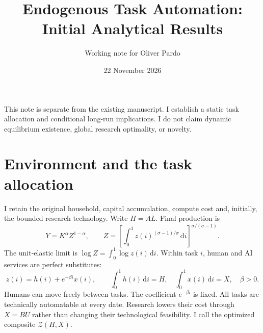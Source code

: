\documentclass[11pt]{article}
\title{Endogenous Task Automation: Initial Analytical Results}
\author{Working note for Oliver Pardo}
\date{22 November 2026}
\newcommand{\dd}{\,\mathrm d}
\begin{document}
\maketitle
\noindent This note is separate from the existing manuscript. I establish a static
task allocation and conditional long-run implications. I do not claim dynamic
equilibrium existence, global research optimality, or novelty.

\section{Environment and the task allocation}
I retain the original household, capital accumulation, compute cost and, initially,
the bounded research technology. Write $H=AL$. Final production is
\begin{equation}
 Y=K^\alpha Z^{1-\alpha},\qquad
 Z=\left[\int_0^1 z(i)^{(\sigma-1)/\sigma}\dd i\right]^{\sigma/(\sigma-1)}.
 \label{eq:tasks-aggregate}
\end{equation}
The unit-elastic limit is $\log Z=\int_0^1\log z(i)\dd i$.
Within task $i$, human and AI services are perfect substitutes:
\begin{equation}
 z(i)=h(i)+e^{-\beta i}x(i),\qquad
 \int_0^1h(i)\dd i=H,\quad \int_0^1x(i)\dd i=X,\quad \beta>0.
 \label{eq:tasks-technology}
\end{equation}
Humans can move freely between tasks. The coefficient $e^{-\beta i}$ is fixed.
All tasks are technically automatable at every date. Research lowers their cost
through $X=BU$ rather than changing their technological feasibility.
I call the optimized composite $\mathcal Z(H,X)$.
\end{document}
